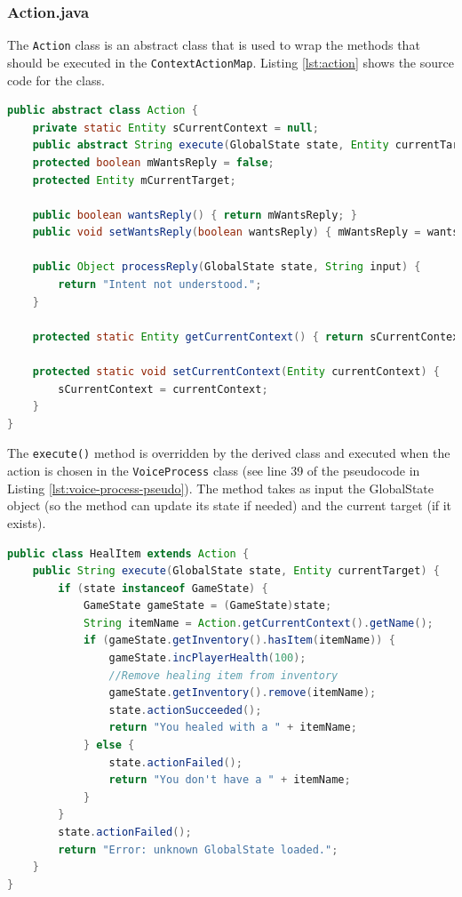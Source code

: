 \documentclass[11pt]{article}
\begin{document}
\subsubsection{Action.java}
\label{section:action}

The \texttt{Action} class is an abstract class that is used to wrap the methods that should be executed in the \texttt{ContextActionMap}. Listing \ref{lst:action} shows the source code for the class.

\begin{lstlisting}[language=Java, caption=Action.java, label={lst:action}]
public abstract class Action {
    private static Entity sCurrentContext = null;
    public abstract String execute(GlobalState state, Entity currentTarget);
    protected boolean mWantsReply = false;
    protected Entity mCurrentTarget;
    
    public boolean wantsReply() { return mWantsReply; }
    public void setWantsReply(boolean wantsReply) { mWantsReply = wantsReply; }

    public Object processReply(GlobalState state, String input) { 
        return "Intent not understood.";
    }

    protected static Entity getCurrentContext() { return sCurrentContext; }

    protected static void setCurrentContext(Entity currentContext) {
        sCurrentContext = currentContext;
    }
}
\end{lstlisting}

The \texttt{execute()} method is overridden by the derived class and executed when the action is chosen in the \texttt{VoiceProcess} class (see line 39 of the pseudocode in Listing \ref{lst:voice-process-pseudo}). The method takes as input the GlobalState object (so the method can update its state if needed) and the current target (if it exists).

\begin{lstlisting}[language=Java, caption=HealItem.java, label={lst:heal-item}]
public class HealItem extends Action {
    public String execute(GlobalState state, Entity currentTarget) {
        if (state instanceof GameState) {
            GameState gameState = (GameState)state;
            String itemName = Action.getCurrentContext().getName();
            if (gameState.getInventory().hasItem(itemName)) {
                gameState.incPlayerHealth(100);
                //Remove healing item from inventory
                gameState.getInventory().remove(itemName);
                state.actionSucceeded();
                return "You healed with a " + itemName;
            } else {
                state.actionFailed();
                return "You don't have a " + itemName;
            }
        }
        state.actionFailed();
        return "Error: unknown GlobalState loaded.";
    }
}
\end{lstlisting}
\end{document}
